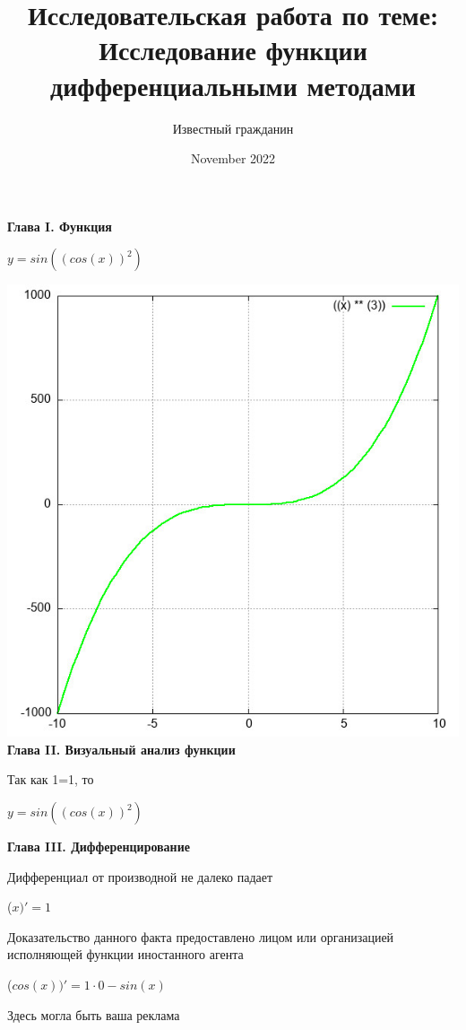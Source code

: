 \documentclass[12pt,a4paper,fleqn]{article}
\title{\textbf{\LARGE{Исследовательская работа по теме:\\Исследование функции дифференциальными методами}}}
\author{Известный гражданин}
\date{November 2022}
\begin{document}
\maketitle
\newpage\newpage \textbf{\LARGE{Глава I. Функция}}

\begin{center}
$y = $$sin((cos(x))^{2})$

\end{center}
\includegraphics{GraphicDumps/plot.jpg}\newpage \textbf{\LARGE{Глава II. Визуальный анализ функции}}

Так как 1=1, то\cite{link4}

\begin{center}
$y = $$sin((cos(x))^{2})$

\end{center}
\newpage \textbf{\LARGE{Глава III. Дифференцирование}}

Дифференциал от производной не далеко падает\cite{link2}

\begin{center}
 ($x)'
  = 1$\end{center}
Доказательство данного факта предоставлено лицом или организацией исполняющей функции иностанного агента

\begin{center}
 ($cos(x))'
  = 1 \cdot 0-sin(x)$\end{center}
Здесь могла быть ваша реклама
\end{document}
